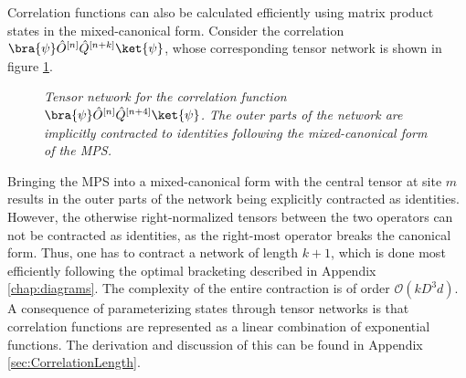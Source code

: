 Correlation functions can also be calculated efficiently using matrix product states in the mixed-canonical form. Consider the correlation $\bra{\psi} \hat{O}^{[n]} \hat{Q}^{[n+k]} \ket{\psi}$, whose corresponding tensor network is shown in figure \ref{fig:CorrelationFunction}.
\begin{figure}[h!]
	\centering
	
	\caption{\textit{Tensor network for the correlation function $\bra{\psi} \hat{O}^{[n]} \hat{Q}^{[n+4]} \ket{\psi}$. The outer parts of the network are implicitly contracted to identities following the mixed-canonical form of the MPS.}}
	\label{fig:CorrelationFunction}
\end{figure}
Bringing the MPS into a mixed-canonical form with the central tensor at site $m$ results in the outer parts of the network being explicitly contracted as identities. However, the otherwise right-normalized tensors between the two operators can not be contracted as identities, as the right-most operator breaks the canonical form. Thus, one has to contract a network of length $k+1$, which is done most efficiently following the optimal bracketing described in Appendix \ref{chap:diagrams}. The complexity of the entire contraction is of order $\mathcal{O}(k D^3 d)$. A consequence of parameterizing states through tensor networks is that correlation functions are represented as a linear combination of exponential functions. The derivation and discussion of this can be found in Appendix \ref{sec:CorrelationLength}.
